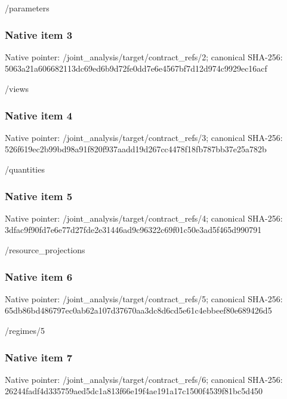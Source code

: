 \documentclass[10pt,a4paper]{article}
\begin{document}
/parameters


\subsubsection{Native item 3}


Native pointer: /joint\_analysis/target/contract\_refs/2; canonical SHA-256: 5063a21a606682113dc69ed6\allowbreak{}b9d72fe0dd7e6e4567bf7d12\allowbreak{}d974c9929ec16acf


/views


\subsubsection{Native item 4}


Native pointer: /joint\_analysis/target/contract\_refs/3; canonical SHA-256: 526f619ec2b99bd98a91f820\allowbreak{}f937aadd19d267cc4478f18f\allowbreak{}b787bb37e25a782b


/quantities


\subsubsection{Native item 5}


Native pointer: /joint\_analysis/target/contract\_refs/4; canonical SHA-256: 3dfac9f90fd7e6e77d27fde2\allowbreak{}e31446ad9c96322c69f01c50\allowbreak{}e3ad5f465d990791


/resource\_projections


\subsubsection{Native item 6}


Native pointer: /joint\_analysis/target/contract\_refs/5; canonical SHA-256: 65db86bd486797ec0ab62a10\allowbreak{}7d37670aa3dc8d6cd5e61c4e\allowbreak{}bbeef80e689426d5


/regimes/5


\subsubsection{Native item 7}


Native pointer: /joint\_analysis/target/contract\_refs/6; canonical SHA-256: 26244fadf4d335759aed5dc1\allowbreak{}a813f66e19f4ae191a17c150\allowbreak{}0f4539f81bc5d450
\end{document}
